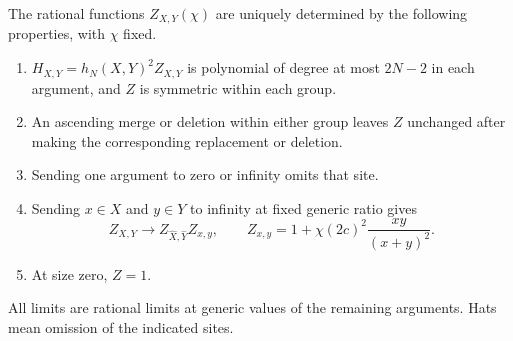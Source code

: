 \begin{lemma}\label{lem:02-characterization}
The rational functions $Z_{X,Y}(\chi)$ are uniquely determined by the
following properties, with $\chi$ fixed.
\begin{enumerate}
\item $H_{X,Y}=h_N(X,Y)^2Z_{X,Y}$ is polynomial of degree at most
$2N-2$ in each argument, and $Z$ is symmetric within each group.
\item An ascending merge or deletion within either group leaves $Z$
unchanged after making the corresponding replacement or deletion.
\item Sending one argument to zero or infinity omits that site.
\item Sending $x\in X$ and $y\in Y$ to infinity at fixed generic
ratio gives
\[
 Z_{X,Y}\longrightarrow Z_{\widehat X,\widehat Y}Z_{x,y},
 \qquad Z_{x,y}=1+\chi(2c)^2\frac{xy}{(x+y)^2}.
\]
\item At size zero, $Z=1$.
\end{enumerate}
All limits are rational limits at generic values of the remaining
arguments. Hats mean omission of the indicated sites.
\end{lemma}
